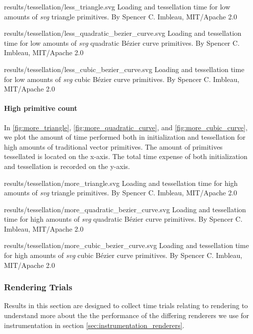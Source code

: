 \widesvg
{results/tessellation/less_triangle.svg}
{Loading and tessellation time for low amounts of \textit{svg} triangle primitives.\label{fig:less_triangle}}
{By Spencer C. Imbleau, MIT/Apache 2.0}\medskip

\widesvg
{results/tessellation/less_quadratic_bezier_curve.svg}
{Loading and tessellation time for low amounts of \textit{svg} quadratic Bézier curve primitives.\label{fig:less_quadratic_curve}}
{By Spencer C. Imbleau, MIT/Apache 2.0}\medskip

\widesvg
{results/tessellation/less_cubic_bezier_curve.svg}
{Loading and tessellation time for low amounts of \textit{svg} cubic Bézier curve primitives.\label{fig:less_cubic_curve}}
{By Spencer C. Imbleau, MIT/Apache 2.0}


\paragraph{High primitive count}
In \cref{fig:more_triangle}, \cref{fig:more_quadratic_curve}, and \cref{fig:more_cubic_curve}, we plot the amount of time performed both in initialization and tessellation for high amounts of traditional vector primitives. The amount of primitives tessellated is located on the x-axis. The total time expense of both initialization and tessellation is recorded on the y-axis.\medskip

\widesvg
{results/tessellation/more_triangle.svg}
{Loading and tessellation time for high amounts of \textit{svg} triangle primitives.\label{fig:more_triangle}}
{By Spencer C. Imbleau, MIT/Apache 2.0}\medskip

\widesvg
{results/tessellation/more_quadratic_bezier_curve.svg}
{Loading and tessellation time for high amounts of \textit{svg} quadratic Bézier curve primitives.\label{fig:more_quadratic_curve}}
{By Spencer C. Imbleau, MIT/Apache 2.0}\medskip

\widesvg
{results/tessellation/more_cubic_bezier_curve.svg}
{Loading and tessellation time for high amounts of \textit{svg} cubic Bézier curve primitives.\label{fig:more_cubic_curve}}
{By Spencer C. Imbleau, MIT/Apache 2.0}


\subsubsection{Rendering Trials}\label{sec:results_rendering}
Results in this section are designed to collect time trials relating to rendering to understand more about the the performance of the differing renderers we use for instrumentation in section \cref{sec:instrumentation_renderers}.

